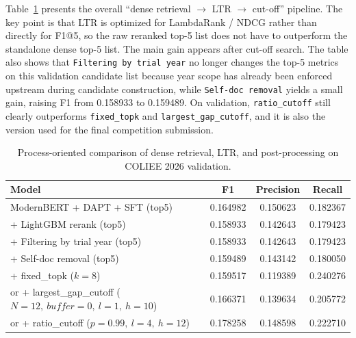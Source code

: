 Table~\ref{tab:ltr-pipeline-progression} presents the overall ``dense retrieval $\rightarrow$ LTR $\rightarrow$ cut-off'' pipeline. The key point is that LTR is optimized for LambdaRank / NDCG rather than directly for F1@5, so the raw reranked top-5 list does not have to outperform the standalone dense top-5 list. The main gain appears after cut-off search. The table also shows that \texttt{Filtering by trial year} no longer changes the top-5 metrics on this validation candidate list because year scope has already been enforced upstream during candidate construction, while \texttt{Self-doc removal} yields a small gain, raising F1 from 0.158933 to 0.159489. On validation, \texttt{ratio\_cutoff} still clearly outperforms \texttt{fixed\_topk} and \texttt{largest\_gap\_cutoff}, and it is also the version used for the final competition submission.

\begin{table}[t]
  \centering
  \scriptsize
  \begin{tabular}{@{}p{}ccc@{}}
    \toprule
    Model & F1 & Precision & Recall \\
    \midrule
    ModernBERT + DAPT + SFT (top5) & 0.164982 & 0.150623 & 0.182367 \\
    + LightGBM rerank (top5) & 0.158933 & 0.142643 & 0.179423 \\
    + Filtering by trial year (top5) & 0.158933 & 0.142643 & 0.179423 \\
    + Self-doc removal (top5) & 0.159489 & 0.143142 & 0.180050 \\
    + fixed\_topk ($k=8$) & 0.159517 & 0.119389 & 0.240276 \\
    \parbox[t]{0.53\columnwidth}{or + largest\_gap\_cutoff\\($N=12,\ buffer=0,\ l=1,\ h=10$)} & 0.166371 & 0.139634 & 0.205772 \\
    \parbox[t]{0.53\columnwidth}{or + ratio\_cutoff\\($p=0.99,\ l=4,\ h=12$)} & 0.178258 & 0.148598 & 0.222710 \\
    \bottomrule
  \end{tabular}
  \caption{Process-oriented comparison of dense retrieval, LTR, and post-processing on COLIEE 2026 validation.}
  \label{tab:ltr-pipeline-progression}
\end{table}

